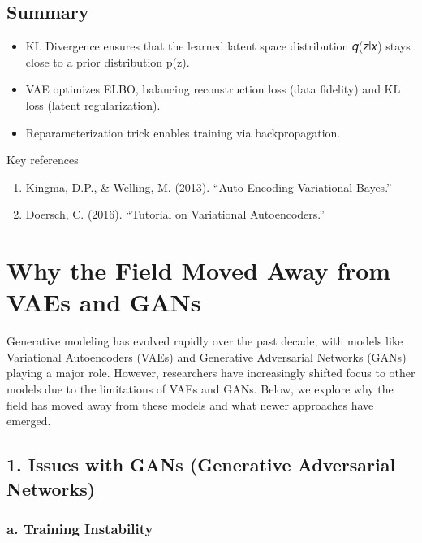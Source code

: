 \documentclass[
]{book}
\providecommand{\tightlist}{%
  \setlength{\itemsep}{0pt}\setlength{\parskip}{0pt}}
\begin{document}
\section{Summary}\label{summary-1}

\begin{itemize}
\tightlist
\item
  KL Divergence ensures that the learned latent space distribution
  𝑞(𝑧∣𝑥) stays close to a prior distribution p(z).
\item
  VAE optimizes ELBO, balancing reconstruction loss (data fidelity) and KL loss (latent regularization).
\item
  Reparameterization trick enables training via backpropagation.
\end{itemize}

Key references

\begin{enumerate}
\def\labelenumi{\arabic{enumi}.}
\tightlist
\item
  Kingma, D.P., \& Welling, M. (2013). ``Auto-Encoding Variational Bayes.''
\item
  Doersch, C. (2016). ``Tutorial on Variational Autoencoders.''
\end{enumerate}

\chapter{Why the Field Moved Away from VAEs and GANs}\label{why-the-field-moved-away-from-vaes-and-gans}

Generative modeling has evolved rapidly over the past decade, with models like Variational Autoencoders (VAEs) and Generative Adversarial Networks (GANs) playing a major role. However, researchers have increasingly shifted focus to other models due to the limitations of VAEs and GANs. Below, we explore why the field has moved away from these models and what newer approaches have emerged.

\section{1. Issues with GANs (Generative Adversarial Networks)}\label{issues-with-gans-generative-adversarial-networks}

\subsection{a. Training Instability}\label{a.-training-instability}
\end{document}

